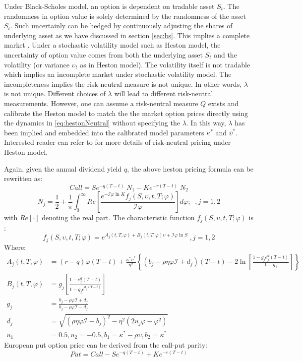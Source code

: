 \documentclass[letterpaper,12pt,titlepage,oneside,final]{book}
\numberwithin{equation}{section}
\theoremstyle{definition}
\begin{document}
Under Black-Scholes model, an option is dependent on tradable asset $S_t$. The randomness in option value is solely determined by the randomness of the asset $S_t$. Such uncertainly can be hedged by continuously adjusting the shares of underlying asset as we have discussed in  section \ref{sec:bs}. This implies a complete market \cite{shreve2004stochastic}.
Under a stochastic volatility model such as Heston model, the uncertainty of option value comes from both the underlying asset $S_t$ and the volatility (or variance $\upsilon_t$ as in Heston model). The volatility itself is not tradable which implies an incomplete market under stochastic volatility model. The incompleteness implies the risk-neutral measure is not unique. In other words, $\lambda$ is not unique. Different choices of $\lambda$ will lead to different risk-neutral measurements. However, one can assume a risk-neutral measure $Q$ exists and calibrate the Heston model to match the the market option prices directly using the dynamics in \eqref{eq:hestonNeutral} without specifying the $\lambda$. In this way, $\lambda$ has been implied and embedded into the calibrated model parameters $\kappa^*$ and $\overline{\upsilon}^*$. Interested reader can refer to \cite{heston1993closed,gatheral2011volatility} for more details of risk-neutral pricing under Heston model.

Again, given the annual dividend yield $q$, the above heston pricing formula can be rewritten as:
\[
Call=S e^{-q(T-t)}\; N_1-Ke^{-r(T-t)} \; N_2
\]
\[
N_j=\frac{1}{2}+\frac{1}{\pi}\int_{0}^{\infty} Re \left[\frac{e^{-\mathcal{I} \varphi \ln{K}} f_j(S,\upsilon,t,T;\varphi)} {\mathcal{I}\varphi} \right] d\varphi;\;\;, j=1,2
\] with $Re[\cdot]$ denoting the real part.
The characteristic function $f_j(S,\upsilon,t,T;\varphi)$ is :
\[
f_j(S,\upsilon,t,T;\varphi)=e^{A_j(t,T,\varphi)+B_j(t,T,\varphi)\upsilon+\mathcal{I} \varphi \ln{S}}\;, j=1,2
\]
Where:
\[
\begin{split}
A_j(t,T,\varphi)&=(r-q) \varphi (T-t)+ \frac{\kappa^* \overline{\upsilon}^*}{\eta^2}\left\{(b_j-\rho \eta \varphi \mathcal{I}+ d_j) (T-t)- 2\ln{\left[ \frac{1-g_je^d_j(T-t)}{1-g_j}\right]}     \right\}\\
B_j(t,T,\varphi)&=g_j\left[ \frac{1-e^d_j(T-t)}{1-g_je^{d_j(T-t)}}\right] \\
g_j&=\frac{b_j-\rho\varphi \mathcal{I}+d_j}{b_j-\rho\varphi \mathcal{I}-d_j}\\
d_j&=\sqrt{(\rho \eta \varphi \mathcal{I}-b_j)^2-\eta^2(2 u_j \varphi- \varphi^2)}\\
u_1&=0.5, u_2=-0.5, b_1=\kappa^*-\rho \upsilon, b_2=\kappa^*
\end{split}
\]
European put option price can be derived from the call-put parity:
\[
Put=Call-S e^{-q (T-t)}+K e^{-r(T-t)}
\]
\end{document}

